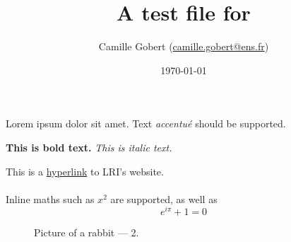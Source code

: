 \documentclass[11pt]{article}
\title{A test file for \iLaTeX}
\author{Camille Gobert (\url{camille.gobert@ens.fr})}
\date{\today}
\begin{document}
    \maketitle
    
    Lorem ipsum dolor sit amet.
    Text \emph{accentu\'e} should be supported.
    
    \textbf{This is bold text.}
    \textit{This is italic text.}
    
    This is a \href{https://www.lri.fr/}{hyperlink} to LRI's website.
    
    \paragraph{}
    Inline maths such as $x^2$ are supported, as well as 
    $$e^{i\pi} + 1 = 0$$
    
    \begin{table}[h]
        \centering
        \caption{Random table.}
        \label{tab:random}
    \end{table}
    

    \begin{figure}[h]
        \centering
        \caption{Picture of a rabbit --- 2.}
        \label{fig:rabbit2}
    \end{figure}
\end{document}
